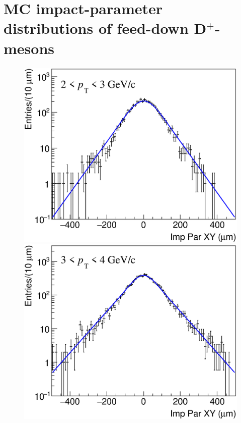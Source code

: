 \documentclass[b5paper,10pt,twoside,oldstyle,classica]{toptesi}
\begin{document}
\section{MC impact-parameter distributions of feed-down D$^+$-mesons}
\begin{figure}[h]
\begin{center}
\vspace{-0.3cm}
{\includegraphics[scale = 0.24]{ImpParRecoFD_2-3.eps}}
\hspace{0cm}
{\includegraphics[scale = 0.24]{ImpParRecoFD_3-4.eps}}
\vspace{0cm}

\end{center}
\end{figure}
\end{document}
